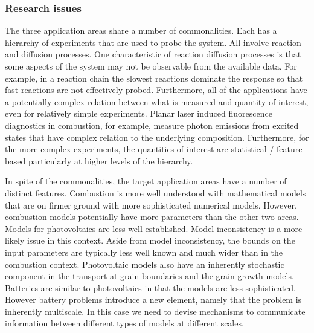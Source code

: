\documentclass[11pt]{article}
\begin{document}
\subsubsection*{Research issues}
The three application areas share a number of commonalities.
Each has a hierarchy of experiments that are used to probe the system.
All involve reaction and diffusion processes.
One characteristic of reaction diffusion processes is that some aspects of the system
may not be observable from the available data. For example, in a reaction chain the slowest
reactions dominate the response so that fast reactions are not effectively probed.
Furthermore, all of the applications
have a potentially complex relation between what is measured and quantity of interest,
even for relatively simple experiments. 
Planar laser induced fluorescence diagnostics in combustion, for example, 
measure photon emissions from excited states that have complex relation to the underlying
composition.
Furthermore, for the more complex experiments, the
quantities of interest are statistical / feature based
particularly at higher levels of the hierarchy.

In spite of the commonalities, the target application areas have a number
of distinct features.
Combustion is more well understood with mathematical models that are on firmer ground
with more sophisticated numerical models.
However, combustion models potentially have more parameters than the other two areas.
Models for photovoltaics are less well established.
Model inconsistency is a more likely issue in this context.
Aside from model inconsistency, the bounds on the input parameters are typically less well known and much wider than in the combustion context. 
Photovoltaic models also have an inherently stochastic component in the transport at grain boundaries and the grain growth models.  
Batteries are similar to photovoltaics
in that the models are less sophisticated. However battery problems introduce a 
new element, namely that the problem is inherently multiscale.
In this case we need to devise mechanisms to communicate information
between different types of models at different scales.
\end{document}
